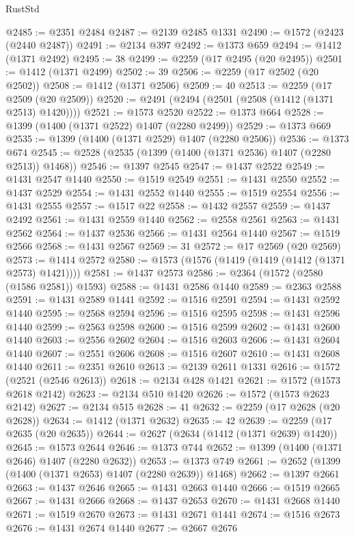 \begin{lexlean}{RustStd}
\begin{coremodule}
@2485 := @2351 @2484
@2487 := @2139 @2485 @1331
@2490 := @1572 (@2423 (@2440 @2487))
@2491 := @2134 @397
@2492 := @1373 @659
@2494 := @1412 (@1371 @2492)
@2495 := 38
@2499 := @2259 (@17 @2495 (@20 @2495))
@2501 := @1412 (@1371 @2499)
@2502 := 39
@2506 := @2259 (@17 @2502 (@20 @2502))
@2508 := @1412 (@1371 @2506)
@2509 := 40
@2513 := @2259 (@17 @2509 (@20 @2509))
@2520 := @2491 (@2494 (@2501 (@2508 (@1412 (@1371 @2513) @1420))))
@2521 := @1573 @2520
@2522 := @1373 @664
@2528 := @1399 (@1400 (@1371 @2522) @1407 (@2280 @2499))
@2529 := @1373 @669
@2535 := @1399 (@1400 (@1371 @2529) @1407 (@2280 @2506))
@2536 := @1373 @674
@2545 := @2528 (@2535 (@1399 (@1400 (@1371 @2536) @1407 (@2280 @2513)) @1468))
@2546 := @1397 @2545
@2547 := @1437 @2522
@2549 := @1431 @2547 @1440
@2550 := @1519 @2549
@2551 := @1431 @2550
@2552 := @1437 @2529
@2554 := @1431 @2552 @1440
@2555 := @1519 @2554
@2556 := @1431 @2555
@2557 := @1517 @22
@2558 := @1432 @2557
@2559 := @1437 @2492
@2561 := @1431 @2559 @1440
@2562 := @2558 @2561
@2563 := @1431 @2562
@2564 := @1437 @2536
@2566 := @1431 @2564 @1440
@2567 := @1519 @2566
@2568 := @1431 @2567
@2569 := 31
@2572 := @17 @2569 (@20 @2569)
@2573 := @1414 @2572
@2580 := @1573 (@1576 (@1419 (@1419 (@1412 (@1371 @2573) @1421))))
@2581 := @1437 @2573
@2586 := @2364 (@1572 (@2580 (@1586 @2581)) @1593)
@2588 := @1431 @2586 @1440
@2589 := @2363 @2588
@2591 := @1431 @2589 @1441
@2592 := @1516 @2591
@2594 := @1431 @2592 @1440
@2595 := @2568 @2594
@2596 := @1516 @2595
@2598 := @1431 @2596 @1440
@2599 := @2563 @2598
@2600 := @1516 @2599
@2602 := @1431 @2600 @1440
@2603 := @2556 @2602
@2604 := @1516 @2603
@2606 := @1431 @2604 @1440
@2607 := @2551 @2606
@2608 := @1516 @2607
@2610 := @1431 @2608 @1440
@2611 := @2351 @2610
@2613 := @2139 @2611 @1331
@2616 := @1572 (@2521 (@2546 @2613))
@2618 := @2134 @428 @1421
@2621 := @1572 (@1573 @2618 @2142)
@2623 := @2134 @510 @1420
@2626 := @1572 (@1573 @2623 @2142)
@2627 := @2134 @515
@2628 := 41
@2632 := @2259 (@17 @2628 (@20 @2628))
@2634 := @1412 (@1371 @2632)
@2635 := 42
@2639 := @2259 (@17 @2635 (@20 @2635))
@2644 := @2627 (@2634 (@1412 (@1371 @2639) @1420))
@2645 := @1573 @2644
@2646 := @1373 @744
@2652 := @1399 (@1400 (@1371 @2646) @1407 (@2280 @2632))
@2653 := @1373 @749
@2661 := @2652 (@1399 (@1400 (@1371 @2653) @1407 (@2280 @2639)) @1468)
@2662 := @1397 @2661
@2663 := @1437 @2646
@2665 := @1431 @2663 @1440
@2666 := @1519 @2665
@2667 := @1431 @2666
@2668 := @1437 @2653
@2670 := @1431 @2668 @1440
@2671 := @1519 @2670
@2673 := @1431 @2671 @1441
@2674 := @1516 @2673
@2676 := @1431 @2674 @1440
@2677 := @2667 @2676

\end{coremodule}
\end{lexlean}
